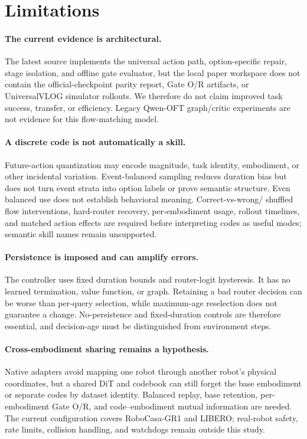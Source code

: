 \section{Limitations}

\paragraph{The current evidence is architectural.}
The latest source implements the universal action path, option-specific repair,
stage isolation, and offline gate evaluator, but the local paper workspace does
not contain the official-checkpoint parity report, Gate O/R artifacts, or
UniversalVLOG simulator rollouts.  We therefore do not claim improved task
success, transfer, or efficiency.  Legacy Qwen-OFT graph/critic experiments are
not evidence for this flow-matching model.

\paragraph{A discrete code is not automatically a skill.}
Future-action quantization may encode magnitude, task identity, embodiment, or
other incidental variation.  Event-balanced sampling reduces duration bias but
does not turn event strata into option labels or prove semantic structure.
Even balanced use does not establish behavioral meaning.  Correct-vs-wrong/
shuffled flow interventions, hard-router recovery, per-embodiment usage,
rollout timelines, and matched action effects are required before interpreting
codes as useful modes; semantic skill names remain unsupported.

\paragraph{Persistence is imposed and can amplify errors.}
The controller uses fixed duration bounds and router-logit hysteresis.  It has
no learned termination, value function, or graph.  Retaining a bad router
decision can be worse than per-query selection, while maximum-age reselection
does not guarantee a change.  No-persistence and fixed-duration controls are
therefore essential, and decision-age must be distinguished from environment
steps.

\paragraph{Cross-embodiment sharing remains a hypothesis.}
Native adapters avoid mapping one robot through another robot's physical
coordinates, but a shared DiT and codebook can still forget the base
embodiment or separate codes by dataset identity.  Balanced replay, base
retention, per-embodiment Gate O/R, and code--embodiment mutual information are
needed.  The current configuration covers RoboCasa-GR1 and LIBERO; real-robot
safety, rate limits, collision handling, and watchdogs remain outside this
study.

